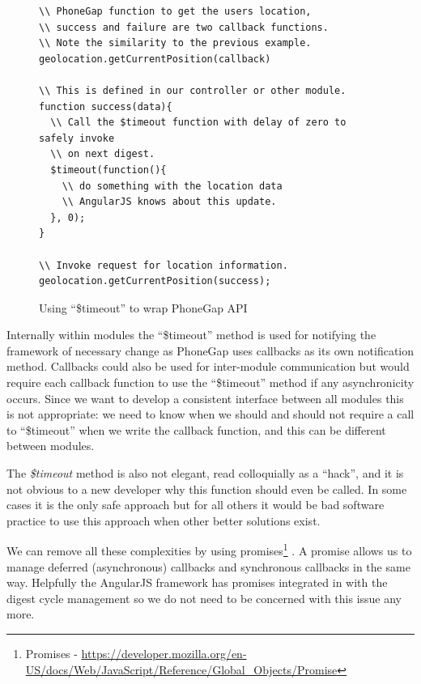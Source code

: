 \begin{figure}[h]
\begin{verbatim}
\\ PhoneGap function to get the users location,
\\ success and failure are two callback functions.
\\ Note the similarity to the previous example.
geolocation.getCurrentPosition(callback)

\\ This is defined in our controller or other module.
function success(data){
  \\ Call the $timeout function with delay of zero to safely invoke
  \\ on next digest.
  $timeout(function(){
    \\ do something with the location data
    \\ AngularJS knows about this update.
  }, 0);
}

\\ Invoke request for location information.
geolocation.getCurrentPosition(success);
\end{verbatim}
\caption{Using ``\$timeout'' to wrap PhoneGap API}
\label{fig:timeout}
\end{figure}

Internally within modules the ``\$timeout'' method is used for
notifying the framework of necessary change as PhoneGap uses callbacks
as its own notification method. Callbacks could also be used for
inter-module communication but would require each callback function to
use the ``\$timeout'' method if any asynchronicity occurs. Since we
want to develop a consistent interface between all modules this is not
appropriate: we need to know when we should and should not require a
call to ``\$timeout'' when we write the callback function, and this
can be different between modules. 

The \emph{\$timeout} method is also
not elegant, read colloquially as a ``hack'', and it is not obvious to
a new developer why this function should even be called. In some cases
it is the only safe approach but for all others it would be bad
software practice to use this approach when other better solutions
exist. 

We can remove all these complexities by using
promises\footnote{Promises -
  \url{https://developer.mozilla.org/en-US/docs/Web/JavaScript/Reference/Global_Objects/Promise}}
. A promise allows us to manage deferred (asynchronous) callbacks and
synchronous callbacks in the same way. Helpfully the AngularJS
framework has promises integrated in with the digest cycle management
so we do not need to be concerned with this issue any more. 

